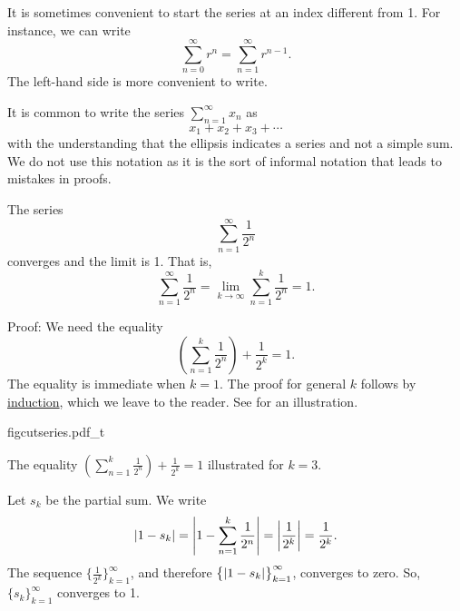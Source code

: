 \begin{remark}
It is sometimes convenient to start
the series at an index different from 1.  For instance, we can write
\begin{equation*}
\sum_{n=0}^\infty r^n = \sum_{n=1}^\infty r^{n-1} .
\end{equation*}
The left-hand side is more convenient to write.
\end{remark}

\begin{remark}
It is common to write the series $\sum_{n=1}^\infty x_n$ as
\begin{equation*}
x_1 + x_2 + x_3 + \cdots
\end{equation*}
with the understanding that the ellipsis indicates a series and
not a simple sum.  We do not use this notation as it is the sort of informal
notation that leads to mistakes in proofs.
\end{remark}

\begin{example}
The series
\begin{equation*}
\sum_{n=1}^\infty \frac{1}{2^n}
\end{equation*}
converges and the limit is 1.  That is,
\begin{equation*}
\sum_{n=1}^\infty \frac{1}{2^n} = 
\lim_{k\to\infty} \sum_{n=1}^k \frac{1}{2^n} = 
1 .
\end{equation*}

Proof: We need the equality
\begin{equation*}
\left( \sum_{n=1}^k \frac{1}{2^n} \right)
+ \frac{1}{2^k}
= 1 .
\end{equation*}
The equality is immediate when $k=1$.  The proof for general $k$
follows by \hyperref[induction:thm]{induction}, which we leave to the
reader.  See  for an illustration.
\begin{myfigureht}
{figcutseries.pdf_t}
\caption{The equality 
$\left( \sum_{n=1}^k \frac{1}{2^n} \right)
+ \frac{1}{2^k}
= 1$ illustrated for $k=3$.\label{figcutseries}}
\end{myfigureht}

Let $s_k$ be the partial sum.  We write
\begin{equation*}
\left\lvert {
1 - s_k 
} \right\rvert
=
\left\lvert {
1 - 
\sum_{n=1}^k \frac{1}{2^n}
} \right\rvert
=
\left\lvert {\frac{1}{2^k}} \right\rvert = 
\frac{1}{2^k} .
\end{equation*}
The sequence $\bigl\{ \frac{1}{2^k} \bigr\}_{k=1}^\infty$, and
therefore $\bigl\{ \left\lvert {1-s_k} \right\rvert \bigr\}_{k=1}^\infty$,
converges to zero.  So, $\{ s_k \}_{k=1}^\infty$ converges to 1.
\end{example}

